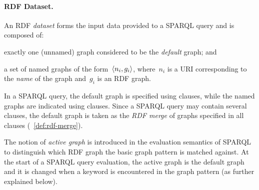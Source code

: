 \paragraph*{RDF Dataset.}%
%
An \ac{RDF} \emph{dataset} forms the input data provided to a SPARQL query and is composed of:
%
\begin{inparaenum}[(i)]
\item exactly one (unnamed) graph considered to be the \emph{default} graph; and
\item a set of named graphs of the form~$\langle n_{i},g_{i} \rangle$, where~$n_{i}$ is a \ac{URI} corresponding to the
  \emph{name} of the graph and~$g_{i}$ is an \ac{RDF} graph.
\end{inparaenum}
%
In a SPARQL query, the default graph is specified using \FROM clauses, while the named graphs are indicated using
\FROMNAMED clauses.
%
Since a SPARQL query may contain several \FROM clauses, the default graph is taken as the \emph{RDF merge} of graphs
specified in all \FROM clauses (\cf~\cref{def:rdf-merge}).

The notion of \emph{active graph} is introduced in the evaluation semantics of SPARQL to distinguish which \ac{RDF}
graph the basic graph pattern is matched against.  At the start of a SPARQL query evaluation, the active graph is the
default graph and it is changed when a \GRAPH keyword is encountered in the graph pattern (as further explained below).
% 


